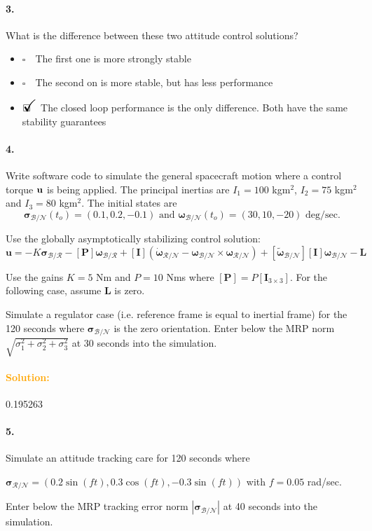 \documentclass[12pt, a4paper]{article}
\newcommand{\ans}{\item[]$\rlap{\LARGE{\checkmark}}\square\quad$}
\newcommand{\noans}{\item[]$\square\quad$}
\begin{document}
\paragraph{3.}
What is the difference between these two attitude control solutions?

\begin{itemize}
\noans The first one is more strongly stable
\noans The second on is more stable, but has less performance
\ans The closed loop performance is the only difference.  Both have the same stability guarantees
\end{itemize}

\paragraph{4.}
Write software code to simulate the general spacecraft motion where a control torque $\bf{u}$ is being applied. The principal inertias are $I_{1} = 100$ kgm$^{2}$, $I_{2} = 75$ kgm$^{2}$ and $I_{3} = 80$ kgm$^{2}$. The initial states are
$$\bm{\sigma}_{\mathcal{B}/\mathcal{N}}(t_{o}) = (0.1,0.2,-0.1)\text{ and }\bm{\omega}_{\mathcal{B}/\mathcal{N}}(t_{o}) = (30,10,-20) \text{ deg/sec.}$$

Use the globally asymptotically stabilizing control solution:
$$\bm{u} = -K\bm{\sigma}_{\mathcal{B}/\mathcal{R}} - [\bm{P}]\bm{\omega}_{\mathcal{B}/\mathcal{R}} + [\bm{I}]\left(\dot{\bm{\omega}}_{\mathcal{R}/\mathcal{N}} - \bm{\omega}_{\mathcal{B}/\mathcal{N}}\times\bm{\omega}_{\mathcal{R}/\mathcal{N}}\right) + [\tilde{\bm{\omega}}_{\mathcal{B}/\mathcal{N}}][\bm{I}]\bm{\omega}_{\mathcal{B}/\mathcal{N}} - \bm{L}$$

Use the gains $K = 5$ Nm and $P = 10$ Nms where $[\bm{P}] = P [\bm{I}_{3\times3}]$. For the following case, assume $\bm{L}$ is zero. \medskip

Simulate a regulator case (i.e. reference frame is equal to inertial frame) for the 120 seconds where $\bm{\sigma}_{\mathcal{B}/\mathcal{N}}$ is the zero orientation. Enter below the MRP norm $\sqrt{\sigma_{1}^{2}+\sigma_{2}^{2}+\sigma_{3}^{2}}$ at 30 seconds into the simulation.

\paragraph{\textcolor{orange}{Solution:}}0.195263

\paragraph{5.}
Simulate an attitude tracking care for 120 seconds where
\begin{center}
$\bm{\sigma}_{\mathcal{R}/\mathcal{N}} = \left(0.2\sin(ft),0.3\cos(ft),-0.3\sin(ft)\right)$ with $f=0.05$ rad/sec.
\end{center}
Enter below the MRP tracking error norm $|\bm{\sigma}_{\mathcal{B}/\mathcal{N}}|$ at 40 seconds into the simulation.
\end{document}

